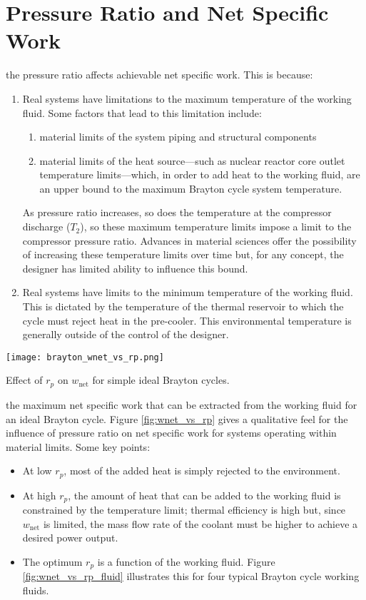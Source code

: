 \section{Pressure Ratio and Net Specific Work}
 the pressure ratio affects achievable net specific work. This is because:
\begin{enumerate}
\item Real systems have limitations to the maximum temperature of the working fluid.  Some factors that lead to this limitation include:
\begin{enumerate}
\item material limits of the system piping and structural components
\item material limits of the heat source---such as nuclear reactor core outlet temperature limits---which, in order to add heat to the working fluid, are an upper bound to the maximum Brayton cycle system temperature.
\end{enumerate}
As pressure ratio increases, so does the temperature at the compressor discharge ($T_2$), so these maximum temperature limits impose a limit to the compressor pressure ratio.  Advances in material sciences offer the possibility of increasing these temperature limits over time but, for any concept, the designer has limited ability to influence this bound.
\item Real systems have limits to the minimum temperature of the working fluid.  This is dictated by the temperature of the thermal reservoir to which the cycle must reject heat in the pre-cooler.  This environmental temperature is generally outside of the control of the designer.  
\end{enumerate}
 
\begin{marginfigure}
\texttt{[image: brayton\_wnet\_vs\_rp.png]}
\caption{Effect of $r_p$ on $w_{\text{net}}$ for simple ideal Brayton cycles.}
\label{fig:wnet_vs_rp}
\end{marginfigure}
 the maximum net specific work that can be extracted from the working fluid for an ideal Brayton cycle. Figure \ref{fig:wnet_vs_rp} gives a qualitative feel for the influence of pressure ratio on net specific work for systems operating within material limits. Some key points:
\begin{itemize}
\item At low $r_p$, most of the added heat is simply rejected to the environment. 
\item At high $r_p$, the amount of heat that can be added to the working fluid is constrained by the temperature limit; thermal efficiency is high but, since $w_{\text{net}}$ is limited, the mass flow rate of the coolant must be higher to achieve a desired power output.
\item The optimum $r_p$ is a function of the working fluid. Figure \ref{fig:wnet_vs_rp_fluid} illustrates this for four typical Brayton cycle working fluids. 
\end{itemize}

